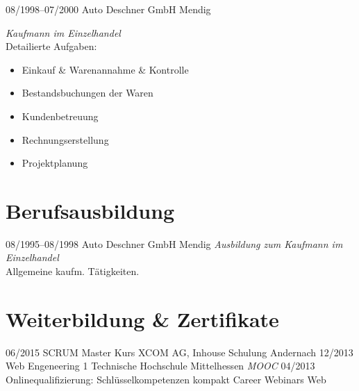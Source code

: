 \documentclass[a4paper]{friggeri-cv} %
\begin{document}
\begin{entrylist}
\entry
{08/1998--07/2000}
{Auto Deschner GmbH}
{Mendig}
{\emph{Kaufmann im Einzelhandel}\\
    Detailierte Aufgaben:
    \begin{itemize}
        \item Einkauf \& Warenannahme \& Kontrolle
        \item Bestandsbuchungen der Waren
        \item Kundenbetreuung
        \item Rechnungserstellung
        \item Projektplanung
    \end{itemize}
}
\end{entrylist}

\section{Berufsausbildung}
\begin{entrylist}
\entry
{08/1995--08/1998}
{Auto Deschner GmbH}
{Mendig}
{\emph{Ausbildung zum Kaufmann im Einzelhandel}\\
Allgemeine kaufm. Tätigkeiten.
}
\end{entrylist}


\section{Weiterbildung \& Zertifikate}

\begin{entrylist}
\entry
{06/2015}
{SCRUM Master Kurs}
{XCOM AG, Inhouse Schulung}
{Andernach}
\entry
{12/2013}
{Web Engeneering 1}
{Technische Hochschule Mittelhessen}
{\emph{MOOC}}
\entry
{04/2013}
{Onlinequalifizierung: Schlüsselkompetenzen kompakt}
{Career Webinars}
{Web}
\end{entrylist}

\end{document}
